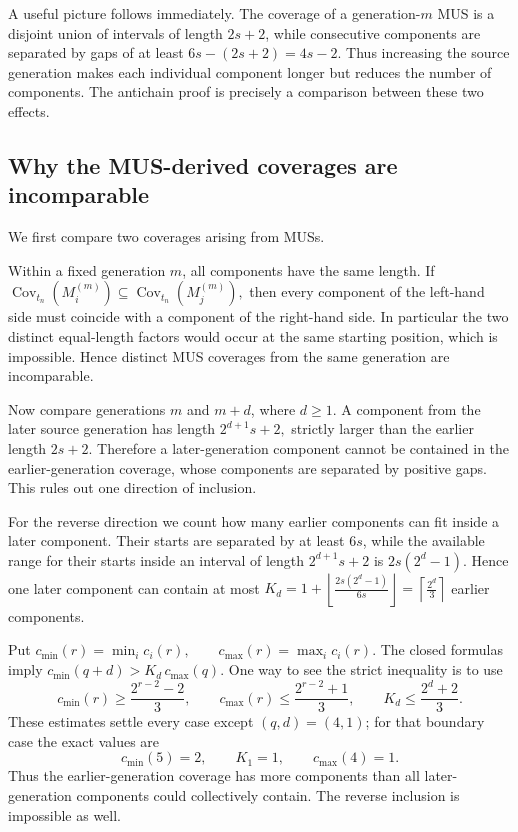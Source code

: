 \documentclass[11pt,a4paper]{article}
\theoremstyle{definition}\newtheorem{definition}[theorem]{Definition}
\theoremstyle{remark}\newtheorem{remark}[theorem]{Remark}
\newcommand{\Cov}{\operatorname{Cov}}
\begin{document}
A useful picture follows immediately.  The coverage of a generation-$m$ MUS is a disjoint union of intervals of length $2s+2$, while consecutive components are separated by gaps of at least
$
 6s-(2s+2)=4s-2.
$
Thus increasing the source generation makes each individual component longer but reduces the number of components.  The antichain proof is precisely a comparison between these two effects.

\subsection{Why the MUS-derived coverages are incomparable}
\label{subsec:mus-antichain}

We first compare two coverages arising from MUSs.

Within a fixed generation $m$, all components have the same length.  If
$
 \Cov_{t_n}(M_i^{(m)})
   \subseteq
 \Cov_{t_n}(M_j^{(m)}),
$
then every component of the left-hand side must coincide with a component of the right-hand side.  In particular the two distinct equal-length factors would occur at the same starting position, which is impossible.  Hence distinct MUS coverages from the same generation are incomparable.

Now compare generations $m$ and $m+d$, where $d\ge1$.  A component from the later source generation has length
$
 2^{d+1}s+2,
$
strictly larger than the earlier length $2s+2$.  Therefore a later-generation component cannot be contained in the earlier-generation coverage, whose components are separated by positive gaps.  This rules out one direction of inclusion.

For the reverse direction we count how many earlier components can fit inside a later component.  Their starts are separated by at least $6s$, while the available range for their starts inside an interval of length $2^{d+1}s+2$ is
$
 2s(2^d-1).
$
Hence one later component can contain at most
$
 K_d
 =1+\left\lfloor\frac{2s(2^d-1)}{6s}\right\rfloor
 =\left\lceil\frac{2^d}{3}\right\rceil
$
earlier components.

Put
$
 c_{\min}(r)=\min_i c_i(r),
 \qquad
 c_{\max}(r)=\max_i c_i(r).
$
The closed formulas imply
$
 c_{\min}(q+d)>K_d\,c_{\max}(q).
$
One way to see the strict inequality is to use
\[
 c_{\min}(r)\ge\frac{2^{r-2}-2}{3},
 \qquad
 c_{\max}(r)\le\frac{2^{r-2}+1}{3},
 \qquad
 K_d\le\frac{2^d+2}{3}.
\]
These estimates settle every case except $(q,d)=(4,1)$; for that boundary case the exact values are
\[
 c_{\min}(5)=2,
 \qquad
 K_1=1,
 \qquad
 c_{\max}(4)=1.
\]
Thus the earlier-generation coverage has more components than all later-generation components could collectively contain.  The reverse inclusion is impossible as well.
\end{document}
